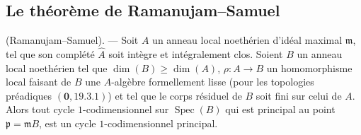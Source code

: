 \subsection{Le théorème de Ramanujam--Samuel}
\label{IV.21.14}

\begin{theorem}[21.14.1]
\label{IV.21.14.1}
\textup{(Ramanujam--Samuel)}. ---
Soit $A$ un anneau local noethérien d'idéal maximal $\mathfrak m$, tel que son complété
$\widehat A$ soit intègre et intégralement clos. Soient $B$ un anneau local noethérien
tel que $\dim(B)\geq\dim(A)$, $\rho:A\to B$ un homomorphisme local faisant de $B$
une $A$-algèbre formellement lisse (pour les topologies préadiques
$(\mathbf 0, 19.3.1)$) et tel que le corps résiduel de $B$ soit fini sur celui de $A$.
Alors tout cycle $1$-codimensionnel sur $\operatorname{Spec}(B)$ qui est principal au
point $\mathfrak p=\mathfrak mB$, est un cycle $1$-codimensionnel principal.
\end{theorem}

